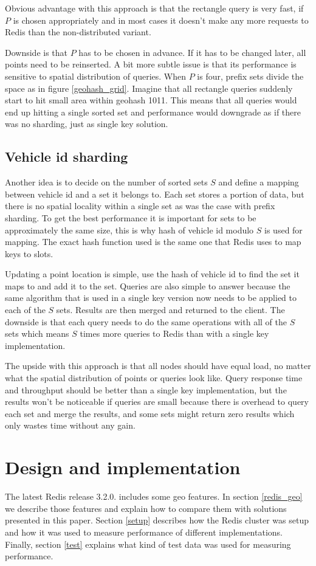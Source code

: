 \documentclass[times, utf8, diplomski]{fer}
\begin{document}
Obvious advantage with this approach is that the rectangle query is very fast, if $P$ is chosen appropriately and in most cases it doesn't make any more requests to Redis than the non-distributed variant.

Downside is that $P$ has to be chosen in advance. If it has to be changed later, all points need to be reinserted. A bit more subtle issue is that its performance is sensitive to spatial distribution of queries. When  $P$ is four, prefix sets divide the space as in figure \ref{geohash_grid}. Imagine that all rectangle queries suddenly start to hit small area within geohash 1011. This means that all queries would end up hitting a single sorted set and performance would downgrade as if there was no sharding, just as single key solution.

\section {Vehicle id sharding} \label {vehicle_id}
Another idea is to decide on the number of sorted sets $S$ and define a mapping between vehicle id and a set it belongs to. Each set stores a portion of data, but there is no spatial locality within a single set as was the case with prefix sharding. To get the best performance it is important for sets to be approximately the same size, this is why hash of vehicle id modulo $S$ is used for mapping. The exact hash function used is the same one that Redis uses to map keys to slots.

Updating a point location is simple, use the hash of vehicle id to find the set it maps to and add it to the set. Queries are also simple to answer because the same algorithm that is used in a single key version now needs to be applied to each of the $S$ sets. Results are then merged and returned to the client. The downside is that each query needs to do the same operations with all of the $S$ sets which means $S$ times more queries to Redis than with a single key implementation.

The upside with this approach is that all nodes should have equal load, no matter what the spatial distribution of points or queries look like. Query response time and throughput should be better than a single key implementation, but the results won't be noticeable if queries are small because there is overhead to query each set and merge the results, and some sets might return zero results which only wastes time without any gain.

\chapter {Design and implementation}
The latest Redis release 3.2.0. includes some geo features. In section \ref{redis_geo} we describe those features and explain how to compare them with solutions presented in this paper. Section \ref{setup} describes how the Redis cluster was setup and how it was used to measure performance of different implementations. Finally, section \ref{test} explains what kind of test data was used for measuring performance.
\end{document}
